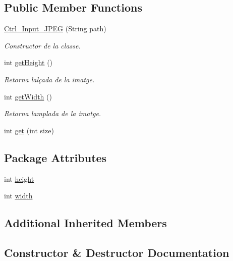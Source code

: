 \subsection*{Public Member Functions}
\begin{DoxyCompactItemize}
\item 
\hyperlink{classpersistencia_1_1input_1_1Ctrl__Input__JPEG_aa7d81dfa6240a7ee82e5188fc2600c58}{Ctrl\+\_\+\+Input\+\_\+\+J\+P\+EG} (String path)
\begin{DoxyCompactList}\small\item\em Constructor de la classe. \end{DoxyCompactList}\item 
int \hyperlink{classpersistencia_1_1input_1_1Ctrl__Input__JPEG_a173716ac8d17365965ede95f99a8e65a}{get\+Height} ()
\begin{DoxyCompactList}\small\item\em Retorna l\textquotesingle{}alçada de la imatge. \end{DoxyCompactList}\item 
int \hyperlink{classpersistencia_1_1input_1_1Ctrl__Input__JPEG_ab4cd4c26db5bd1ce89f6e53458c99ba8}{get\+Width} ()
\begin{DoxyCompactList}\small\item\em Retorna l\textquotesingle{}amplada de la imatge. \end{DoxyCompactList}\item 
int \hyperlink{classpersistencia_1_1input_1_1Ctrl__Input__JPEG_a702b13d096ba57f06b242987f0dbf4ec}{get} (int size)
\end{DoxyCompactItemize}
\subsection*{Package Attributes}
\begin{DoxyCompactItemize}
\item 
int \hyperlink{classpersistencia_1_1input_1_1Ctrl__Input__JPEG_a9e6805b998e58981f8cd7b8b6e609f27}{height}
\item 
int \hyperlink{classpersistencia_1_1input_1_1Ctrl__Input__JPEG_a07d902b25b54941dc0444398c7d380e7}{width}
\end{DoxyCompactItemize}
\subsection*{Additional Inherited Members}


\subsection{Constructor \& Destructor Documentation}
\mbox{\label{classpersistencia_1_1input_1_1Ctrl__Input__JPEG_aa7d81dfa6240a7ee82e5188fc2600c58}} 
